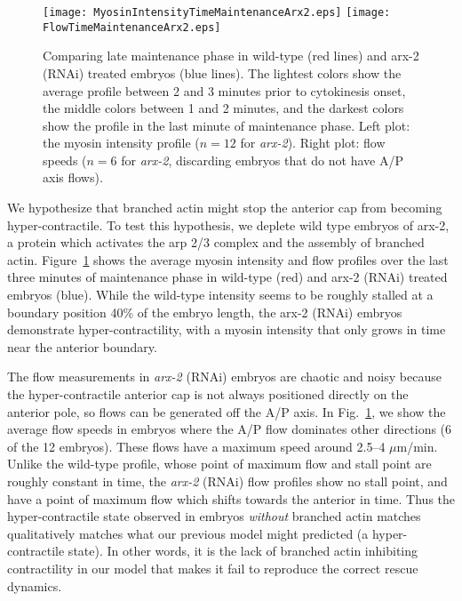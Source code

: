 \documentclass[11pt]{article}
\newcommand{\6}[1]{#1_{\text{6}}}
\newcommand{\3}[1]{#1_{\text{3}}}
\begin{document}
\begin{figure}
\centering
\texttt{[image: MyosinIntensityTimeMaintenanceArx2.eps]}
\texttt{[image: FlowTimeMaintenanceArx2.eps]}
\caption{\label{fig:Arp23Myosin} Comparing late maintenance phase in wild-type (red lines) and arx-2 (RNAi) treated embryos (blue lines). The lightest colors show the average profile between 2 and 3 minutes prior to cytokinesis onset, the middle colors between 1 and 2 minutes, and the darkest colors show the profile in the last minute of maintenance phase. Left plot: the myosin intensity profile ($n=12$ for \emph{arx-2}). Right plot: flow speeds ($n=6$ for \emph{arx-2}, discarding embryos that do not have A/P axis flows).}
\end{figure}

We hypothesize that branched actin might stop the anterior cap from becoming hyper-contractile. To test this hypothesis, we deplete wild type embryos of arx-2, a protein which activates the arp 2/3 complex and the assembly of branched actin. Figure\ \ref{fig:Arp23Myosin} shows the average myosin intensity and flow profiles over the last three minutes of maintenance phase in wild-type (red) and arx-2 (RNAi) treated embryos (blue). While the wild-type intensity seems to be roughly stalled at a boundary position 40\% of the embryo length, the arx-2 (RNAi) embryos demonstrate hyper-contractility, with a myosin intensity that only grows in time near the anterior boundary. 

The flow measurements in \emph{arx-2} (RNAi) embryos are chaotic and noisy because the hyper-contractile anterior cap is not always positioned directly on the anterior pole, so flows can be generated off the A/P axis. In Fig.\ \ref{fig:Arp23Myosin}, we show the average flow speeds in embryos where the A/P flow dominates other directions (6 of the 12 embryos). These flows have a maximum speed around 2.5--4 $\mu$m/min. Unlike the wild-type profile, whose point of maximum flow and stall point are roughly constant in time, the \emph{arx-2} (RNAi) flow profiles show no stall point, and have a point of maximum flow which shifts towards the anterior in time. Thus the hyper-contractile state observed in embryos \emph{without} branched actin matches qualitatively matches what our previous model might predicted (a hyper-contractile state). In other words, it is the lack of branched actin inhibiting contractility in our model that makes it fail to reproduce the correct rescue dynamics.
\end{document}
